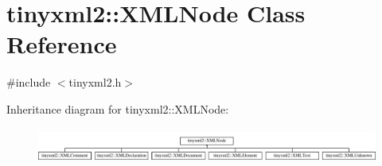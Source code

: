 \hypertarget{classtinyxml2_1_1_x_m_l_node}{\section{tinyxml2\+:\+:X\+M\+L\+Node Class Reference}
\label{classtinyxml2_1_1_x_m_l_node}
}


{\ttfamily \#include $<$tinyxml2.\+h$>$}

Inheritance diagram for tinyxml2\+:\+:X\+M\+L\+Node\+:\begin{figure}[H]
\begin{center}
\leavevmode
\includegraphics[height=1.145194cm]{classtinyxml2_1_1_x_m_l_node}
\end{center}
\end{figure}
